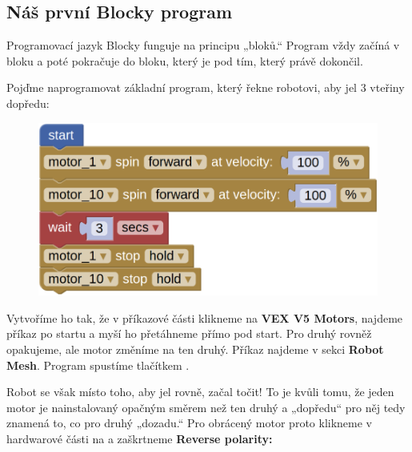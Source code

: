 \documentclass[../main.tex]{subfiles}
\begin{document}
	\subsection{Náš první Blocky program}

	Programovací jazyk Blocky funguje na principu „bloků.“ Program vždy začíná v bloku \blockStartImage a poté pokračuje do bloku, který je pod tím, který právě dokončil.

	Pojďme naprogramovat základní program, který řekne robotovi, aby jel $3$ vteřiny dopředu:

	\begin{figure}[h!]
		\centering
		\begin{minipage}{0.5\textwidth}
			\includegraphics[width=\linewidth]{../Images/01/program-1.png}
		\end{minipage}
	\end{figure}

	Vytvoříme ho tak, že v příkazové části klikneme na \textbf{VEX V5 Motors}, najdeme příkaz po startu a myší ho přetáhneme přímo pod start. Pro druhý rovněž opakujeme, ale motor změníme na ten druhý. Příkaz \blockWaitImage najdeme v sekci \textbf{Robot Mesh}. Program spustíme tlačítkem .

	Robot se však místo toho, aby jel rovně, začal točit! To je kvůli tomu, že jeden motor je nainstalovaný opačným směrem než ten druhý a „dopředu“ pro něj tedy znamená to, co pro druhý „dozadu.“ Pro obrácený motor proto klikneme v hardwarové části na  a zaškrtneme \textbf{Reverse polarity:}
\end{document}
